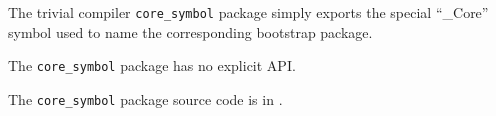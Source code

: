 
The trivial compiler {\tt core\_symbol} package simply exports the special ``\_Core'' 
symbol used to name the corresponding bootstrap package.

The {\tt core\_symbol} package has no explicit API.

The {\tt core\_symbol} package source code is in .



